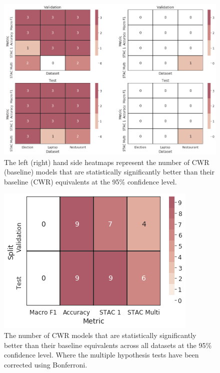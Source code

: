 \begin{figure}[!h]
    \centering
    \includegraphics[scale=0.4]{images/augmentation/methods_performance/CWR/cwr_dataset_metric_sig.png}
    \caption{The left (right) hand side heatmaps represent the number of CWR (baseline) models that are statistically significantly better than their baseline (CWR) equivalents at the 95\% confidence level.}
    \label{fig:aug_cwr_dataset_metric_sig}
\end{figure}

\begin{figure}[!h]
    \centering
    \includegraphics[scale=0.4]{images/augmentation/methods_performance/CWR/cwr_sig_metric.png}
    \caption{The number of CWR models that are statistically significantly better than their baseline equivalents across all datasets at the 95\% confidence level. Where the multiple hypothesis tests have been corrected using Bonferroni.}
    \label{fig:aug_cwr_sig_metric}
\end{figure}

